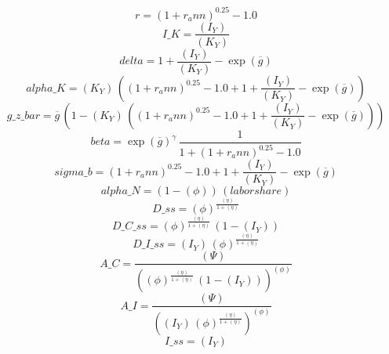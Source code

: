 \begin{dmath*}
r = \left(1+{{r_ann}}\right)^{0.25}-1.0
\end{dmath*}
\begin{dmath*}
I\_K = \frac{{(I_Y)}}{{(K_Y)}}
\end{dmath*}
\begin{dmath*}
delta = 1+\frac{{(I_Y)}}{{(K_Y)}}-\exp\left({{\overline{g}}}\right)
\end{dmath*}
\begin{dmath*}
alpha\_K = {(K_Y)}\, \left(\left(1+{{r_ann}}\right)^{0.25}-1.0+1+\frac{{(I_Y)}}{{(K_Y)}}-\exp\left({{\overline{g}}}\right)\right)
\end{dmath*}
\begin{dmath*}
g\_z\_bar = {{\overline{g}}}\, \left(1-{(K_Y)}\, \left(\left(1+{{r_ann}}\right)^{0.25}-1.0+1+\frac{{(I_Y)}}{{(K_Y)}}-\exp\left({{\overline{g}}}\right)\right)\right)
\end{dmath*}
\begin{dmath*}
beta = \exp\left({{\overline{g}}}\right)^{{{\gamma}}}\, \frac{1}{1+\left(1+{{r_ann}}\right)^{0.25}-1.0}
\end{dmath*}
\begin{dmath*}
sigma\_b = \left(1+{{r_ann}}\right)^{0.25}-1.0+1+\frac{{(I_Y)}}{{(K_Y)}}-\exp\left({{\overline{g}}}\right)
\end{dmath*}
\begin{dmath*}
alpha\_N = \left(1-{(\phi)}\right)\, {(labor share)}
\end{dmath*}
\begin{dmath*}
D\_ss = {(\phi)}^{\frac{{(\eta)}}{1+{(\eta)}}}
\end{dmath*}
\begin{dmath*}
D\_C\_ss = {(\phi)}^{\frac{{(\eta)}}{1+{(\eta)}}}\, \left(1-{(I_Y)}\right)
\end{dmath*}
\begin{dmath*}
D\_I\_ss = {(I_Y)}\, {(\phi)}^{\frac{{(\eta)}}{1+{(\eta)}}}
\end{dmath*}
\begin{dmath*}
A\_C = \frac{{(\Psi)}}{\left({(\phi)}^{\frac{{(\eta)}}{1+{(\eta)}}}\, \left(1-{(I_Y)}\right)\right)^{{(\phi)}}}
\end{dmath*}
\begin{dmath*}
A\_I = \frac{{(\Psi)}}{\left({(I_Y)}\, {(\phi)}^{\frac{{(\eta)}}{1+{(\eta)}}}\right)^{{(\phi)}}}
\end{dmath*}
\begin{dmath*}
I\_ss = {(I_Y)}
\end{dmath*}
